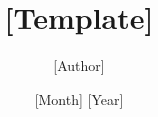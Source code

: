 \documentclass{article}
\title{[Template]}
\author{[Author]}
\date{[Month] [Year]}
\begin{document}
\maketitle

\section*{}
\end{document}
